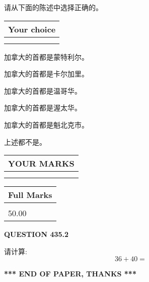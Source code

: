 \documentclass{ctexart}
\begin{document}
  
请从下面的陈述中选择正确的。
  
  
\noindent\hspace{3.0in} \begin{tabular}{|l|}
\hline
Your choice \\
\hline
 \\ 
 \\ 
\hline
\end{tabular}
  
  
 
 
加拿大的首都是蒙特利尔。
 
 
加拿大的首都是卡尔加里。
 
 
加拿大的首都是温哥华。
 
 
加拿大的首都是渥太华。
 
 
加拿大的首都是魁北克市。
 
 
 上述都不是。
 
 
  
\vspace{0.2in}
  
\noindent\begin{tabular}{|l|}
\hline
 YOUR MARKS  \\
\hline
 \\ 
 \\ 
\hline
\end{tabular}
\hspace{0.05in} \begin{tabular}{|l|}
\hline
 Full Marks  \\
\hline
 \\ 
50.00 \\
\hline
\end{tabular}
{\textbf{\Large{QUESTION
435.2 
}}}
  
  
 
请计算:
\begin{equation}
36 +  %
40 = \nonumber
\end{equation}
 

 

 
   
   
 \vspace{0.2in}
 
   
   
   
   
\vspace{1.0in} 
{\textbf{\large{ *** END OF PAPER, THANKS *** }}} 
   
\end{document}
